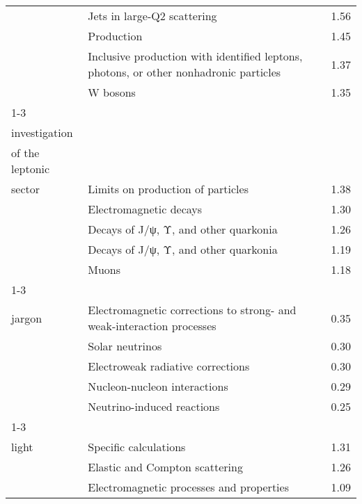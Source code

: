 \begin{longtable}[H]{p{}|p{}|p{}}
                                        & Jets in large-Q2 scattering &  1.56 \\
                                        & Production &  1.45 \\
                                        & Inclusive production with identified leptons, photons, or other nonhadronic particles &  1.37 \\
                                        & W bosons &  1.35 \\
\cline{1-3}
\multirow{5}{*}{\begin{tabular}{l}Experimental\\ investigation\\ of the leptonic\\ sector\end{tabular}} & Limits on production of particles &  1.38 \\
                                        & Electromagnetic decays &  1.30 \\
                                        & Decays of J/ψ, Υ, and other quarkonia &  1.26 \\
                                        & Decays of J/ψ, Υ, and other quarkonia &  1.19 \\
                                        & Muons &  1.18 \\
\cline{1-3}
\multirow{5}{*}{\begin{tabular}{l}Experimental\\ jargon\end{tabular}} & Electromagnetic corrections to strong- and weak-interaction processes &  0.35 \\
                                        & Solar neutrinos &  0.30 \\
                                        & Electroweak radiative corrections &  0.30 \\
                                        & Nucleon-nucleon interactions &  0.29 \\
                                        & Neutrino-induced reactions &  0.25 \\
\cline{1-3}
\multirow{5}{*}{\begin{tabular}{l}Experiments on\\ light\end{tabular}} & Specific calculations &  1.31 \\
                                        & Elastic and Compton scattering &  1.26 \\
                                        & Electromagnetic processes and properties &  1.09 \\

\end{longtable}
